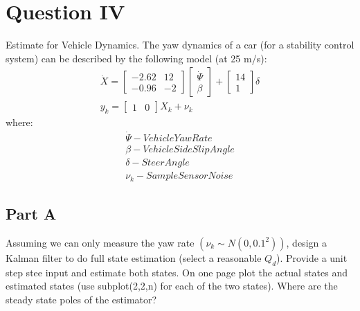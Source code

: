 \documentclass{article}
\begin{document}
\section*{Question IV}
Estimate for Vehicle Dynamics. The yaw dynamics of a car (for a stability control system) can be described by the following model (at 25 m/s):
\begin{gather}
    \dot{X} = \begin{bmatrix}
        -2.62 & 12 \\
        -0.96 & -2
    \end{bmatrix}\begin{bmatrix}
        \dot{\Psi} \\
        \beta
    \end{bmatrix} + \begin{bmatrix}
        14 \\
        1
    \end{bmatrix}\delta \\
    y_k = \begin{bmatrix}
        1 & 0
    \end{bmatrix}X_k + \nu_k
\end{gather}
where:
\begin{gather}
    \dot{\Psi} - Vehicle Yaw Rate\\
    \beta - Vehicle Side Slip Angle\\
    \delta - Steer Angle\\
    \nu_k - Sample Sensor Noise
\end{gather}
\subsection*{Part A}
Assuming we can only measure the yaw rate $(\nu_k\sim N(0, 0.1^2))$, design a Kalman filter to do full state estimation (select a reasonable $Q_d$). Provide a unit step stee input and estimate both states.  On one page plot the actual states and estimated states (use subplot(2,2,n) for each of the two states). Where are the steady state poles of the estimator?
\end{document}
